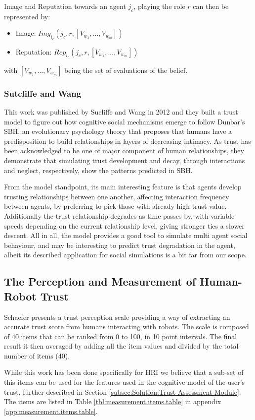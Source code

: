 Image and Reputation towards an agent $j_c$, playing the role $r$ can then be represented by:
\begin{itemize}
	\item Image: $Img_{i_c} (j_c, r, [V_{w_1}, ..., V_{w_m}])$
	\item Reputation: $Rep_{i_c} (j_c, r, [V_{w_1}, ..., V_{w_m}])$
\end{itemize}
with $[V_{w_1}, ..., V_{w_m}]$ being the set of evaluations of the belief.


\subsubsection{Sutcliffe and Wang}
\label{subsubsec:Related work:Sutcliffe and Wang}
This work was published by Sucliffe and Wang in 2012\cite{Sutcliffe2012} and they built a trust model to figure out how cognitive social mechanisms emerge to follow Dunbar's \ac{SBH}\cite{Dunbar1998}, an evolutionary psychology theory that proposes that humans have a predisposition to build relationships in layers of decreasing intimacy. As trust has been acknowledged to be one of major component of human relationships, they demonstrate that simulating trust development and decay, through interactions and neglect, respectively, show the patterns predicted in \ac{SBH}.

From the model standpoint, its main interesting feature is that agents develop trusting relationships between one another, affecting interaction frequency between agents, by preferring to pick those with already high trust value. Additionally the trust relationship degrades as time passes by, with variable speeds depending on the current relationship level, giving stronger ties a slower descent. All in all, the model provides a good tool to simulate multi agent social behaviour, and may be interesting to predict trust degradation in the agent, albeit its described application for social simulations is a bit far from our scope.

\subsection{The Perception and Measurement of Human-Robot Trust}
\label{subsec:Related work:The Perception and Measurement of Human-Robot Trust}

Schaefer\cite{Schaefer2009} presents a trust perception scale providing a way of extracting an accurate trust score from humans interacting with robots. The scale is composed of 40 items that can be ranked from 0 to 100, in 10 point intervals. The final result it then averaged by adding all the item values and divided by the total number of items (40). 

While this work has been done specifically for \ac{HRI} we believe that a sub-set of this items can be used for the features used in the cognitive model of the user's trust, further described in Section \ref{subsec:Solution:Trust Assessment Module}. The items are listed in Table \ref{tbl:measurement.items.table} in appendix \ref{app:measurement.items.table}.
